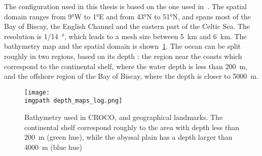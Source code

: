 \documentclass[../../Main_ManuscritThese.tex]{subfiles}
\newcommand{\CROCO}{CROCO}
\newcommand\imgpath{/home/victor/acadwriting/Manuscrit/Text/Chapter5/img/}
\begin{document}
The configuration used in this thesis is based on the one used
in~\cite{boutet_estimation_2015}. The spatial domain ranges from
\ang{9}W to \ang{1}E and from \ang{43}N to \ang{51}N, and spans most
of the Bay of Biscay, the English Channel and the eastern part of the
Celtic Sea.  The resolution is \SI{1/14}{\degree}, which leads to a
mesh size between \SI{5}{\kilo\metre} and \SI{6}{\kilo\metre}. The
bathymetry map and the spatial domain is
shown~\cref{fig:depth_maps}. The ocean can be split roughly in two
regions, based on its depth : the region near the coasts which
correspond to the continental shelf, where the water depth is less
than \SI{200}{\meter}, and the offshore region of the Bay of Biscay,
where the depth is closer to \SI{5000}{\meter}.
\begin{figure}[ht]
  \centering
  \texttt{[image: \\imgpath depth\_maps\_log.png]}
  \caption[Bathymetry chart of the domain modelled]{\label{fig:depth_maps} Bathymetry used in \CROCO, and
    geographical landmarks. The continental shelf correspond roughly
    to the area with depth less than \SI{200}{\meter} (green hue),
    while the abyssal plain has a depth larger than \SI{4000}{\meter}
    (blue hue)}
\end{figure}
\end{document}
